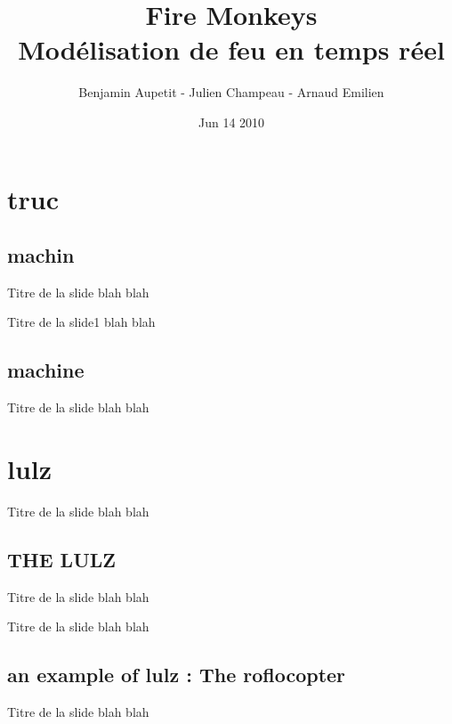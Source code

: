 \documentclass{beamer}
\title{Fire Monkeys\\ Modélisation de feu en temps réel}
\author{Benjamin Aupetit - Julien Champeau - Arnaud Emilien}
\date{Jun 14 2010}
\begin{document}
\begin{frame}
   \titlepage
\end{frame}

\section{truc}
\subsection{machin}
\begin{frame}{Titre de la slide}
  blah blah
\end{frame}

\begin{frame}{Titre de la slide1}
  blah blah
\end{frame}

\subsection{machine}
\begin{frame}{Titre de la slide}
  blah blah
\end{frame}

\section{lulz}
\begin{frame}{Titre de la slide}
  blah blah
\end{frame}

\subsection{THE LULZ}
\begin{frame}{Titre de la slide}
  blah blah
\end{frame}
\begin{frame}{Titre de la slide}
  blah blah
\end{frame}

\subsection{an example of lulz : The roflocopter}
\begin{frame}{Titre de la slide}
  blah blah
\end{frame}
\end{document}
